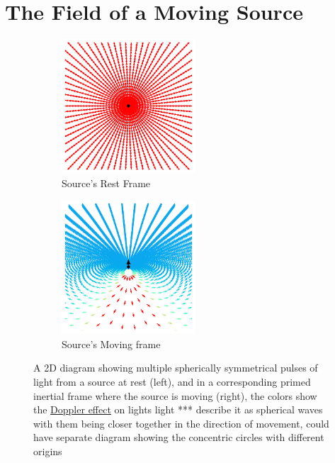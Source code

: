 

\chapter{The Field of a Moving Source}

\begin{figure}[H]
	\begin{subfigure}{.49\textwidth}
		\centering
		\includegraphics[width=5cm]{images/pdf/Field_Rest_Frame.pdf}
		\caption{Source's Rest Frame}
	\end{subfigure}
	\begin{subfigure}{.49\textwidth}
		\centering
		\includegraphics[width=5cm]{images/pdf/Field_Moving_Frame_Doppler.pdf}
		\caption{Source's Moving frame}
	\end{subfigure}
	\caption{A 2D diagram showing multiple spherically symmetrical pulses of light from a source at rest (left), and in a corresponding primed inertial frame where the source is moving (right), the colors show the \protect\hyperlink{def-doppler-effect}{Doppler effect} on lights light *** describe it as spherical waves with them being closer together in the direction of movement, could have separate diagram showing the concentric circles with different origins}
	\label{fig: full field transformation 2}
\end{figure}

